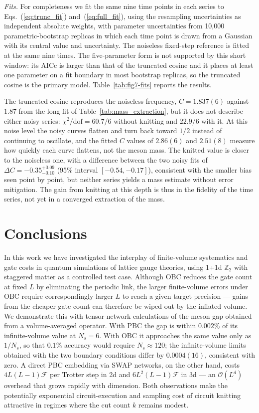 \documentclass[twocolumn,superscriptaddress,showpacs,nofootinbib,notitlepage,preprintnumbers,secnumarabic,amssymb, floatfix, nobibnotes, aps, prd]{revtex4-2}
\begin{document}
\noindent\textit{Fits.}\quad
For completeness we fit the same nine time points in each series to
Eqs.~(\ref{eq:trunc_fit}) and~(\ref{eq:full_fit}), using the resampling
uncertainties as independent absolute weights, with parameter uncertainties
from 10,000 parametric-bootstrap replicas in which each time point is drawn
from a Gaussian with its central value and uncertainty.  The noiseless
fixed-step reference is fitted at the same nine times.  The five-parameter
form is not supported by this short window: its AICc is larger than that of
the truncated cosine and it places at least one parameter on a fit boundary
in most bootstrap replicas, so the truncated cosine is the primary model.
Table~\ref{tab:fig7-fits} reports the results.



The truncated cosine reproduces the noiseless frequency,
$C=1.837(6)$ against $1.87$ from the long fit of
Table~\ref{tab:mass_extraction}, but it does not describe either noisy
series: $\chi^2/\mathrm{dof}=60.7/6$ without knitting and $22.9/6$ with it.
At this noise level the noisy curves flatten and turn back toward $1/2$
instead of continuing to oscillate, and the fitted $C$ values of $2.86(6)$
and $2.51(8)$ measure how quickly each curve flattens, not the meson mass.
The knitted value is closer to the noiseless one, with a difference between
the two noisy fits of $\Delta C=-0.35^{+0.09}_{-0.10}$ (95\% interval
$[-0.54,-0.17]$), consistent with the smaller bias seen point by point, but
neither series yields a mass estimate without error mitigation.  The gain
from knitting at this depth is thus in the fidelity of the time series, not
yet in a converged extraction of the mass.

\section{Conclusions}
\label{sec:conclusion}

In this work we have investigated the interplay of finite-volume
systematics and gate costs in quantum simulations of lattice gauge
theories, using 1+1d $\mathbb{Z}_2$ with staggered matter as a
controlled test case.  Although OBC reduces the gate count at fixed
$L$ by eliminating the periodic link, the larger finite-volume errors
under OBC require correspondingly larger $L$ to reach a given target
precision --- gains from the cheaper gate count can therefore be wiped
out by the inflated volume.  We demonstrate this with tensor-network
calculations of the meson gap obtained from a volume-averaged operator.
With PBC the gap is within $0.002\%$ of its infinite-volume value at
$N_s=6$.  With OBC it approaches the same value only as $1/N_s$, so
that $0.1\%$ accuracy would require $N_s\approx120$; the
infinite-volume limits obtained with the two boundary conditions differ
by $0.0004(16)$, consistent with zero.
A direct PBC embedding via SWAP
networks, on the other hand, costs $4L(L{-}1)\mathcal{F}$ per Trotter
step in 2d and $6L^2(L{-}1)\mathcal{F}$ in 3d --- an $\mathcal{O}(L^d)$
overhead that grows rapidly with dimension.  Both observations make
the potentially exponential circuit-execution and sampling cost of circuit knitting
attractive in regimes where the cut count $k$ remains modest.
\end{document}
